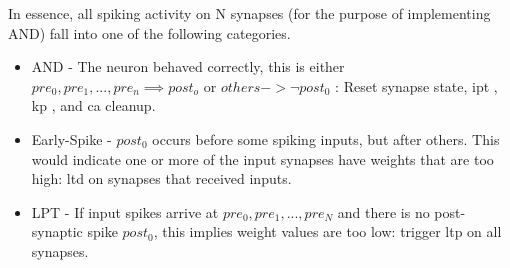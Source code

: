 \documentclass[conference]{IEEEtran}
\newcommand{\ca}{\gls{ca}\textrm{ }}
\newcommand{\ipt}{\gls{ipt}\textrm{ }}
\newcommand{\kp}{\gls{kp}\textrm{ }}
\begin{document}
In essence, all spiking activity on N synapses (for the purpose of implementing
AND) fall into one of the following categories.
\begin{itemize}
\item AND - The neuron behaved correctly, this is either $pre_0, pre_1, ...,
  pre_n \implies post_o$ or $others -> \neg post_0$ : Reset synapse state, \ipt,
  \kp, and \ca cleanup.
\item Early-Spike - $post_0$ occurs before some spiking inputs, but after
  others. This would indicate one or more of the input synapses have weights
  that are too high: \gls{ltd} on synapses that received inputs.
\item LPT - If input spikes arrive at $pre_0, pre_1, ..., pre_N$ and there is no
  post-synaptic spike $post_0$, this implies weight values are too low: trigger
  \gls{ltp} on all synapses.
\end{itemize}

\end{document}
